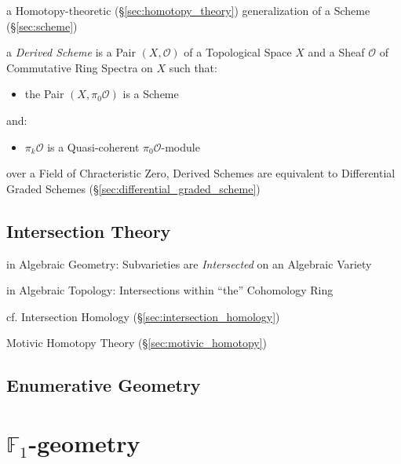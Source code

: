 a Homotopy-theoretic (\S\ref{sec:homotopy_theory}) generalization of a Scheme
(\S\ref{sec:scheme})

a \emph{Derived Scheme} is a Pair $(X, \mathcal{O})$ of a Topological Space $X$
and a Sheaf $\mathcal{O}$ of Commutative Ring Spectra on $X$ such that:
\begin{itemize}
\item the Pair $(X, \pi_0\mathcal{O})$ is a Scheme
\end{itemize}
and:
\begin{itemize}
\item $\pi_k\mathcal{O}$ is a Quasi-coherent $\pi_0\mathcal{O}$-module
\end{itemize}

over a Field of Chracteristic Zero, Derived Schemes are equivalent to
Differential Graded Schemes (\S\ref{sec:differential_graded_scheme})



\subsection{Intersection Theory}\label{sec:intersection_theory}

in Algebraic Geometry: Subvarieties are \emph{Intersected} on an
Algebraic Variety

in Algebraic Topology: Intersections within ``the'' Cohomology Ring

\fist cf. Intersection Homology (\S\ref{sec:intersection_homology})

\fist Motivic Homotopy Theory (\S\ref{sec:motivic_homotopy})



\subsection{Enumerative Geometry}\label{sec:enumerative_geometry}



\section{$\mathbb{F}_1$-geometry}\label{sec:f1_geometry}

